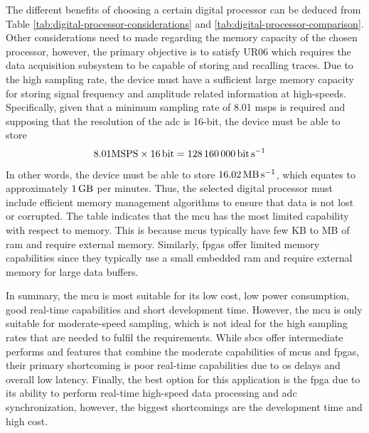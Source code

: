 \documentclass[class=report,11pt,crop=false]{standalone}
\begin{document}
	The different benefits of choosing a certain digital processor can be deduced from Table \ref{tab:digital-processor-considerations} and \ref{tab:digital-processor-comparison}. Other considerations need to made regarding the memory capacity of the chosen processor, however, the primary objective is to satisfy UR06 which requires the data acquisition subsystem to be capable of storing and recalling traces. Due to the high sampling rate, the device must have a sufficient large memory capacity for storing signal frequency and amplitude related information at high-speeds. Specifically, given that a minimum sampling rate of 8.01 \acrshort{msps} is required and supposing that the resolution of the \acrshort{adc} is 16-bit, the device must be able to store
	\begin{align}
		8.01 \text{MSPS} \times \SI{16}{\bit} & = \SI{128160000}{\bit\per\second}\nonumber
	\end{align}
	In other words, the device must be able to store $\SI{16.02}{\mega\byte\per\second}$, which equates to approximately $\SI{1}{\giga\byte}$ per minutes. Thus, the selected digital processor must include efficient memory management algorithms to ensure that data is not lost or corrupted. The table indicates that the \acrshort{mcu} has the most limited capability with respect to memory. This is because \acrshort{mcu}s typically have few KB to MB of \acrshort{ram} and require external memory. Similarly, \acrshort{fpga}s offer limited memory capabilities since they typically use a small embedded \acrshort{ram} and require external memory for large data buffers. 
	
	In summary, the \acrshort{mcu} is most suitable for its low cost, low power consumption, good real-time capabilities and short development time. However, the \acrshort{mcu} is only suitable for moderate-speed sampling, which is not ideal for the high sampling rates that are needed to fulfil the requirements. While \acrshort{sbc}s offer intermediate performs and features that combine the moderate capabilities of \acrshort{mcu}s and \acrshort{fpga}s, their primary shortcoming is poor real-time capabilities due to \acrshort{os} delays and overall low latency. Finally, the best option for this application is the \acrshort{fpga} due to its ability to perform real-time high-speed data processing and \acrshort{adc} synchronization, however, the biggest shortcomings are the development time and high cost. 
	
\end{document}
